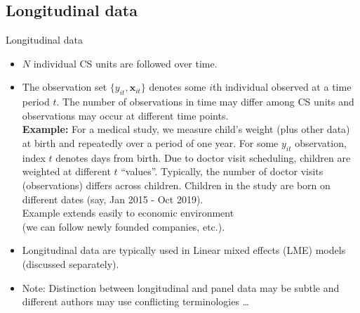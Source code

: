 \documentclass[usenames,dvipsnames]{beamer}
\begin{document}
\subsection*{Longitudinal data}
\begin{frame}{Longitudinal data}
\footnotesize
\begin{itemize}
\item $N$ individual CS units are followed over time.
\medskip
\item The observation set $\{y_{it},\bm{x}_{it}\}$ denotes some $i$th individual  observed at a time period $t$. The number of observations in time may differ among CS units and observations may occur at different time points. \\ \medskip 
\textbf{Example:} For a medical study, we measure child's weight (plus other data) at birth and repeatedly over a period of one year. For some $y_{it}$ observation, index $t$ denotes days from birth. Due to doctor visit scheduling, children are weighted at different $t$ ``values''. Typically, the number of doctor visits (observations) differs across children. Children in the study are born on different dates (say, Jan 2015 - Oct 2019). \\ \medskip Example extends easily to economic environment \\(we can follow newly founded companies, etc.).
\medskip
\item Longitudinal data are typically used in Linear mixed effects (LME) models (discussed separately).
\medskip
\item Note: Distinction between longitudinal and panel data may be subtle and different authors may use conflicting terminologies \dots
\end{itemize}
\end{frame}
\end{document}
